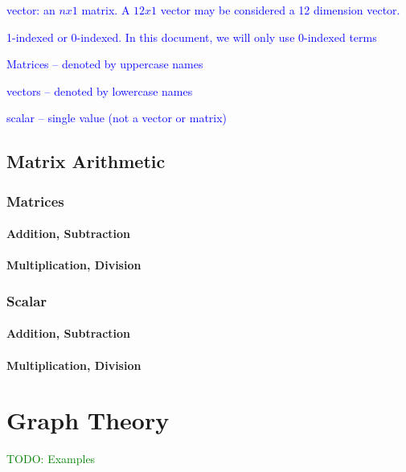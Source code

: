 \textcolor{blue}{vector: an $n x 1$ matrix. A $12 x 1$ vector may be considered a 12 dimension vector.}

\textcolor{blue}{1-indexed or 0-indexed. In this document, we will only use 0-indexed terms}

\textcolor{blue}{Matrices -- denoted by uppercase names}

\textcolor{blue}{vectors -- denoted by lowercase names}

\textcolor{blue}{scalar -- single value (not a vector or matrix)}

\subsection{Matrix Arithmetic}

\subsubsection{Matrices}

\paragraph{Addition, Subtraction}

\paragraph{Multiplication, Division}

\subsubsection{Scalar}

\paragraph{Addition, Subtraction}

\paragraph{Multiplication, Division}



\section{Graph Theory}

\textcolor{green}{TODO: Examples}